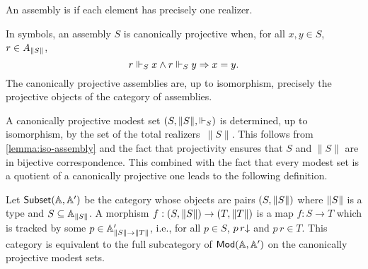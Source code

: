 
\begin{definition}
  An assembly is  if each element has
  precisely one realizer.
\end{definition}

\noindent
In symbols, an assembly $S$ is canonically projective when, for all
$x, y \in S$, $r \in A_{\T{S}}$,
%
\begin{equation*}
  r \rz[S] x \land r \rz[S] y \lthen x = y.
\end{equation*}
%
The canonically projective assemblies are, up to isomorphism,
precisely the projective objects of the category of assemblies.

A canonically projective modest set $(S, \T{S}, {\rz[S]})$ is determined,
up to isomorphism, by the set of the total realizers~$\|S\|$. This
follows from \cref{lemma:iso-assembly} and the fact that
projectivity ensures that $S$ and $\|S\|$ are in bijective
correspondence. This combined with the fact that every modest set is a
quotient of a canonically projective one leads to the following
definition.

Let $\subcat{\AA, \subAA}$ be the category whose objects are pairs
$(S, \T{S})$ where $\T{S}$ is a type and $S \subseteq \Atyp{\T{S}}$. A morphism
$f : (S, \T{S}) \to (T, \T{T})$ is a map $f : S \to T$ which is tracked by
some $p \in \subAtyp{\T{S} \to \T{T}}$, i.e., for all $p \in S$,
$\defined{p\,r}$ and $p\,r \in T$. This category is equivalent to the
full subcategory of $\Mod{\AA, \subAA}$ on the canonically projective
modest sets.



